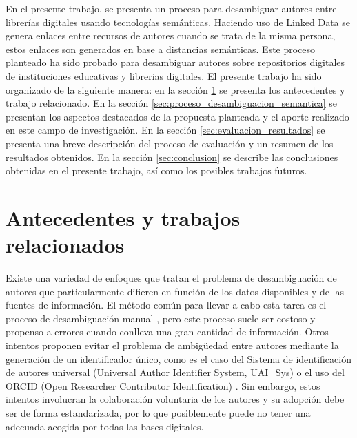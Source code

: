 \documentclass[conference]{IEEEtran}
\begin{document}
En el presente trabajo, se presenta un proceso para desambiguar autores entre librerías digitales usando tecnologías semánticas. Haciendo uso de Linked Data \cite{bizer2009linked} se genera enlaces entre recursos de autores cuando se trata de la misma persona, estos enlaces son generados en base a distancias semánticas. Este proceso planteado ha sido probado para desambiguar autores sobre repositorios digitales de instituciones educativas y librerias digitales. %
El presente trabajo ha sido organizado de la siguiente manera: en la sección \ref{sec:antecedentes_trabajos_relacionados} se presenta los antecedentes y trabajo relacionado. En la sección \ref{sec:proceso_desambiguacion_semantica} se presentan los aspectos destacados de la  propuesta planteada y el aporte realizado en este campo de investigación. En la sección \ref{sec:evaluacion_resultados}  se presenta una breve descripción del proceso de evaluación y un resumen de los resultados obtenidos. En la sección \ref{sec:conclusion} se  describe las conclusiones obtenidas en el presente trabajo, así como los posibles trabajos futuros.

\section{Antecedentes y trabajos relacionados}
\label{sec:antecedentes_trabajos_relacionados}
Existe una variedad de enfoques que tratan el problema de desambiguación de autores que particularmente difieren en función de los datos disponibles y de las fuentes de información. El método común para llevar a cabo esta tarea es el proceso de desambiguación manual \cite{doi:10.1300/J115v22n04_01}, pero este proceso suele ser costoso y propenso a errores cuando conlleva una gran cantidad de información. Otros intentos proponen evitar el problema de ambigüedad entre autores  mediante la generación de un identificador único, como es el caso del Sistema de identificación de autores universal (Universal Author Identifier System, UAI\_Sys) \cite{Dervos2007TheUA} o el uso del ORCID (Open Researcher Contributor Identification) \cite{Haak2012ORCIDAS}. Sin embargo, estos intentos involucran la colaboración voluntaria  de los autores y su adopción debe ser de forma estandarizada, por lo que posiblemente puede no tener una adecuada acogida por todas las bases digitales. 
\end{document}
